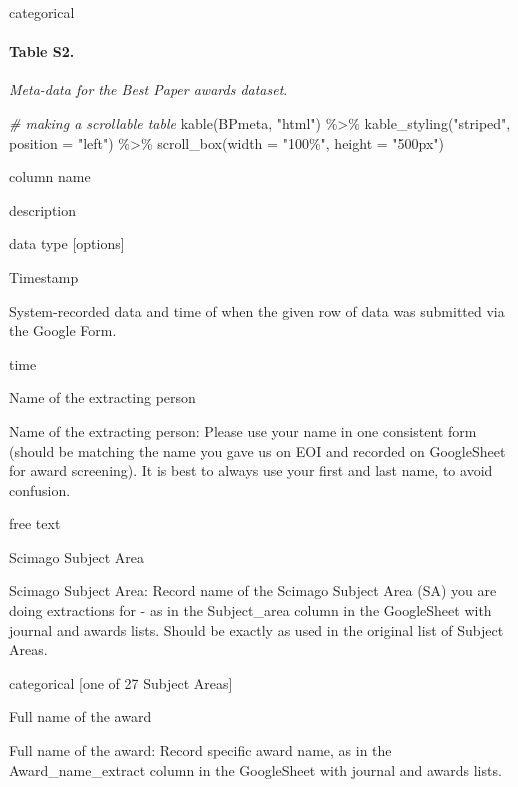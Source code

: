 \documentclass[
]{article}
\newenvironment{Shaded}{\begin{snugshade}}{\end{snugshade}}
\newcommand{\AttributeTok}[1]{\textcolor[rgb]{0.77,0.63,0.00}{#1}}
\newcommand{\CommentTok}[1]{\textcolor[rgb]{0.56,0.35,0.01}{\textit{#1}}}
\newcommand{\FunctionTok}[1]{\textcolor[rgb]{0.00,0.00,0.00}{#1}}
\newcommand{\NormalTok}[1]{#1}
\newcommand{\SpecialCharTok}[1]{\textcolor[rgb]{0.00,0.00,0.00}{#1}}
\newcommand{\StringTok}[1]{\textcolor[rgb]{0.31,0.60,0.02}{#1}}
\begin{document}
categorical

\hypertarget{table-s2.}{%
\paragraph{Table S2.}\label{table-s2.}}

\emph{Meta-data for the Best Paper awards dataset}.

\begin{Shaded}
\begin{Highlighting}[]
\CommentTok{\# making a scrollable table}
\FunctionTok{kable}\NormalTok{(BPmeta, }\StringTok{"html"}\NormalTok{) }\SpecialCharTok{\%\textgreater{}\%}
  \FunctionTok{kable\_styling}\NormalTok{(}\StringTok{"striped"}\NormalTok{, }\AttributeTok{position =} \StringTok{"left"}\NormalTok{) }\SpecialCharTok{\%\textgreater{}\%}
  \FunctionTok{scroll\_box}\NormalTok{(}\AttributeTok{width =} \StringTok{"100\%"}\NormalTok{, }\AttributeTok{height =} \StringTok{"500px"}\NormalTok{)}
\end{Highlighting}
\end{Shaded}

column name

description

data type {[}options{]}

Timestamp

System-recorded data and time of when the given row of data was
submitted via the Google Form.

time

Name of the extracting person

Name of the extracting person: Please use your name in one consistent
form (should be matching the name you gave us on EOI and recorded on
GoogleSheet for award screening). It is best to always use your first
and last name, to avoid confusion.

free text

Scimago Subject Area

Scimago Subject Area: Record name of the Scimago Subject Area (SA) you
are doing extractions for - as in the Subject\_area column in the
GoogleSheet with journal and awards lists. Should be exactly as used in
the original list of Subject Areas.

categorical {[}one of 27 Subject Areas{]}

Full name of the award

Full name of the award: Record specific award name, as in the
Award\_name\_extract column in the GoogleSheet with journal and awards
lists.
\end{document}
